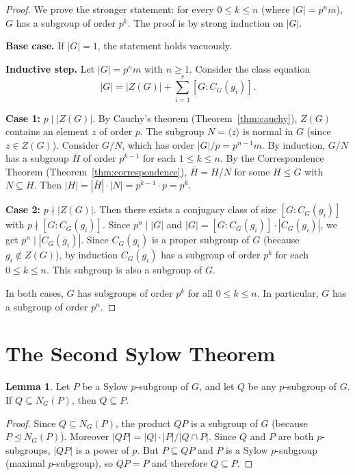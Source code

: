 \documentclass[12pt,a4paper,openany]{book}
\theoremstyle{definition}
\newtheorem{lemma}{Lemma}[chapter]
\theoremstyle{remark}
\begin{document}
\begin{proof}
We prove the stronger statement: for every $0\le k\le n$ (where
$|G|=p^n m$), $G$ has a subgroup of order $p^k$.  The proof is by
strong induction on $|G|$.

\textbf{Base case.}  If $|G|=1$, the statement holds vacuously.

\textbf{Inductive step.}
Let $|G|=p^n m$ with $n\ge 1$.  Consider the class equation
\[
   |G| = |Z(G)| + \sum_{i=1}^{r} [G:C_G(g_i)].
\]

\textbf{Case 1:} $p\mid |Z(G)|$.
By Cauchy's theorem (Theorem~\ref{thm:cauchy}), $Z(G)$ contains an
element $z$ of order $p$.  The subgroup $N=\langle z\rangle$ is
normal in $G$ (since $z\in Z(G)$).  Consider $G/N$, which has order
$|G|/p = p^{n-1}m$.  By induction, $G/N$ has a subgroup $\bar{H}$
of order $p^{k-1}$ for each $1\le k\le n$.  By the Correspondence
Theorem (Theorem~\ref{thm:correspondence}), $\bar{H}=H/N$ for some
$H\le G$ with $N\subseteq H$.  Then $|H|=|\bar{H}|\cdot|N|=p^{k-1}\cdot p=p^k$.

\textbf{Case 2:} $p\nmid|Z(G)|$.
Then there exists a conjugacy class of size $[G:C_G(g_i)]$ with
$p\nmid[G:C_G(g_i)]$.  Since $p^n\mid|G|$ and $|G|=[G:C_G(g_i)]\cdot|C_G(g_i)|$,
we get $p^n\mid|C_G(g_i)|$.  Since $C_G(g_i)$ is a proper subgroup
of $G$ (because $g_i\notin Z(G)$), by induction $C_G(g_i)$ has a
subgroup of order $p^k$ for each $0\le k\le n$.  This subgroup is also
a subgroup of $G$.

In both cases, $G$ has subgroups of order $p^k$ for all $0\le k\le n$.
In particular, $G$ has a subgroup of order $p^n$.
\end{proof}

\section{The Second Sylow Theorem}\label{sec:sylow-II}

\begin{lemma}\label{lem:p-subgroup-normalizer}
Let $P$ be a Sylow $p$-subgroup of $G$, and let $Q$ be any
$p$-subgroup of $G$.  If $Q\subseteq N_G(P)$, then $Q\subseteq P$.
\end{lemma}

\begin{proof}
Since $Q\subseteq N_G(P)$, the product $QP$ is a subgroup of $G$
(because $P\trianglelefteq N_G(P)$).  Moreover $|QP|=|Q|\cdot|P|/|Q\cap P|$.
Since $Q$ and $P$ are both $p$-subgroups, $|QP|$ is a power of $p$.
But $P\subseteq QP$ and $P$ is a Sylow $p$-subgroup (maximal
$p$-subgroup), so $QP=P$ and therefore $Q\subseteq P$.
\end{proof}
\end{document}
